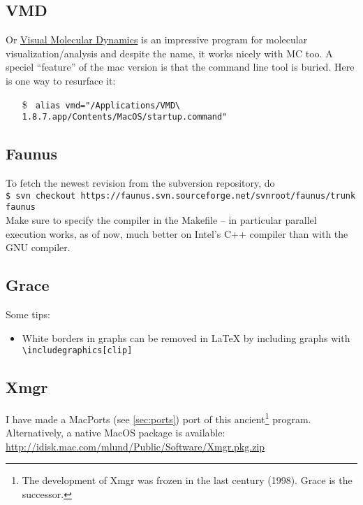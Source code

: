 \documentclass[a4paper,10pt]{article}
\begin{document}
\subsection{VMD}
Or \href{http://www.google.com/search?q=vmd}{Visual Molecular Dynamics} is an impressive program for molecular visualization/analysis and despite the name, it works nicely with MC too. A speciel ``feature'' of the mac version is that the command line tool is buried. Here is one way to resurface it:
\begin{itemize}
\item[\$] \verb+ alias vmd="/Applications/VMD\ 1.8.7.app/Contents/MacOS/startup.command"+
\end{itemize}

\subsection{Faunus}
To fetch the newest revision from the subversion repository, do\\

\verb+$ svn checkout https://faunus.svn.sourceforge.net/svnroot/faunus/trunk faunus+\\

\noindent Make sure to specify the compiler in the Makefile -- in particular parallel execution works, as of now, much better on Intel's C++ compiler than with the GNU compiler.

\subsection{\label{sec:grace}Grace}
Some tips:
\begin{itemize}
\item White borders in graphs can be removed in \LaTeX{} by including graphs with\\

\verb+\includegraphics[clip]+
\end{itemize}

\subsection{Xmgr}
I have made a MacPorts (see \ref{sec:ports}) port of this ancient\footnote{The development of Xmgr was frozen in the last century (1998). Grace is the successor.} program. Alternatively, a native MacOS package is available:\\

\url{http://idisk.mac.com/mlund/Public/Software/Xmgr.pkg.zip}\\
\end{document}
